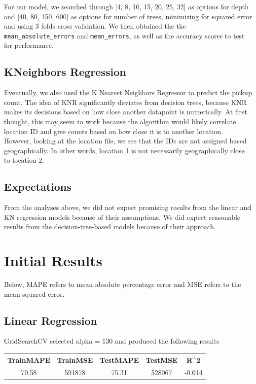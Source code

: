 \documentclass[journal, 12pt]{IEEEtran}
\newcommand{\cc}[1]{\texttt{#1}}
\begin{document}
\noindent For our model, we searched through [4, 8, 10, 15, 20, 25, 32] as options for depth and [40, 80, 150, 600] as options for number of trees, minimizing for squared error and using 3 folds cross validation. We then obtained the the \cc{mean\_absolute\_errors} and \cc{mean\squared\_errors}, as well as the accuracy scores to test for performance. 

\subsection{KNeighbors Regression}

\noindent Eventually, we also used the K Nearest Neighbors Regressor to predict the pickup count. The idea of KNR significantly deviates from decision trees, because KNR makes its decisions based on how close another datapoint is numerically. At first thought, this may seem to work because the algorithm would likely correlate location ID and give counts based on how close it is to another location. However, looking at the location file, we see that the IDs are not assigned based geographically. In other words, location 1 is not necessarily geographically close to location 2. 

\subsection{Expectations}

\noindent From the analyses above, we did not expect promising results from the linear and KN regression models because of their assumptions. We did expect reasonable results from the decision-tree-based models because of their approach. 

\section{Initial Results}

\noindent Below, MAPE refers to mean absolute percentage error and MSE refers to the mean squared error.

\subsection{Linear Regression}

\noindent GridSearchCV selected alpha = 130 and produced the following results\\


\begingroup
    \medskip
    \centering
    \def\arraystretch{1.5}
        \begin{tabular}{ccccc}
            \toprule
            TrainMAPE & TrainMSE & TestMAPE & TestMSE & R^2 \\
            \midrule
            70.58 & 591878 & 75.31 & 528067 & -0.014\\
            \bottomrule
        \end{tabular}
    \label{table:}
    \medskip
\endgroup
\end{document}
